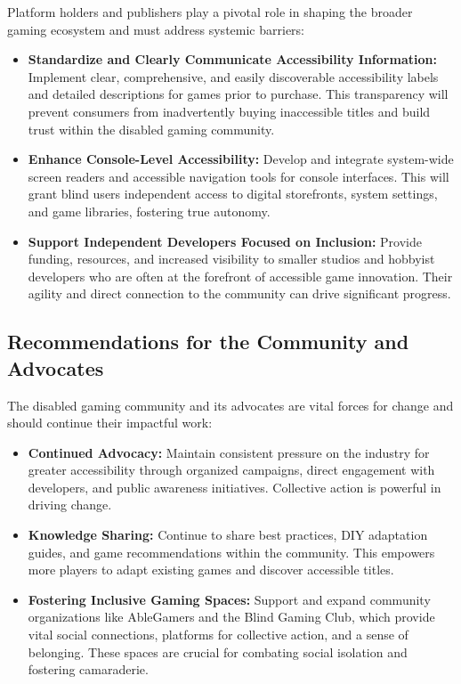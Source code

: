 Platform holders and publishers play a pivotal role in shaping the broader gaming ecosystem and must address systemic barriers:
\begin{itemize}
    \item \textbf{Standardize and Clearly Communicate Accessibility Information:} Implement clear, comprehensive, and easily discoverable accessibility labels and detailed descriptions for games prior to purchase\supercite{ScopeGamingReport}. This transparency will prevent consumers from inadvertently buying inaccessible titles and build trust within the disabled gaming community.
    \item \textbf{Enhance Console-Level Accessibility:} Develop and integrate system-wide screen readers and accessible navigation tools for console interfaces\supercite{LudaccessList}. This will grant blind users independent access to digital storefronts, system settings, and game libraries, fostering true autonomy.
    \item \textbf{Support Independent Developers Focused on Inclusion:} Provide funding, resources, and increased visibility to smaller studios and hobbyist developers who are often at the forefront of accessible game innovation\supercite{SegwiseTrends2025}. Their agility and direct connection to the community can drive significant progress.
\end{itemize}

\subsection{Recommendations for the Community and Advocates}

The disabled gaming community and its advocates are vital forces for change and should continue their impactful work:
\begin{itemize}
    \item \textbf{Continued Advocacy:} Maintain consistent pressure on the industry for greater accessibility through organized campaigns, direct engagement with developers, and public awareness initiatives\supercite{ResearchGateInclusiveGames}. Collective action is powerful in driving change.
    \item \textbf{Knowledge Sharing:} Continue to share best practices, DIY adaptation guides, and game recommendations within the community\supercite{NFBBoardGames}. This empowers more players to adapt existing games and discover accessible titles.
    \item \textbf{Fostering Inclusive Gaming Spaces:} Support and expand community organizations like AbleGamers and the Blind Gaming Club, which provide vital social connections, platforms for collective action, and a sense of belonging\supercite{AbleGamers2025}. These spaces are crucial for combating social isolation and fostering camaraderie.
\end{itemize}


